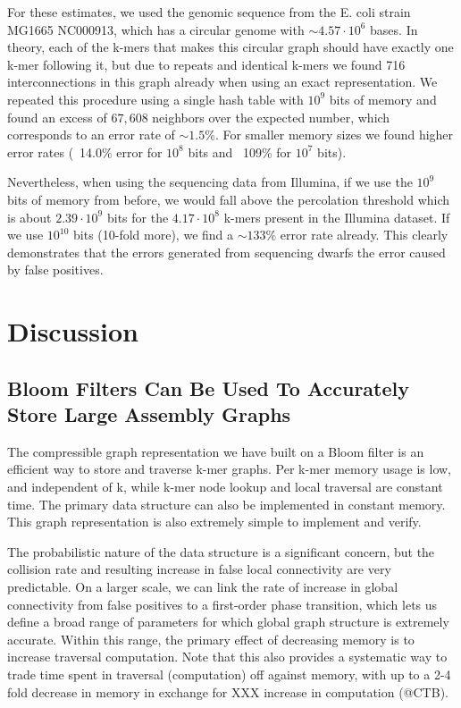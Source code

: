 \documentclass[12pt]{article} \usepackage{simplemargins}
\begin{document}
For these estimates, we used the genomic sequence from the E. coli strain 
MG1665 NC000913, which has a circular genome with $\sim 4.57 \cdot 10^6$ bases. 
In theory, each of the k-mers that makes this
circular graph should have exactly one k-mer following it, but due to 
repeats and identical k-mers we found 716 interconnections in this graph 
already when using an exact representation. We repeated this procedure 
using a single hash table with $10^9$ bits of memory and found an excess of 
$67,608$ neighbors over the expected number, which corresponds to an error rate of 
$\sim 1.5\%$. For smaller memory 
sizes we found higher error rates (~14.0\% error for $10^8$ bits and 
~109\% for $10^7$ bits).

Nevertheless, when using 
the sequencing data from Illumina, if we use the $10^9$ bits of memory 
from before, we would fall above the percolation threshold which is 
about $2.39 \cdot 10^9$ bits for the 
$4.17 \cdot 10^8$ k-mers present in the Illumina dataset. 
If we use $10^{10}$ bits (10-fold more), we find a $\sim 133\%$ 
error rate already. This clearly demonstrates that
the errors generated from sequencing dwarfs the error caused by false positives.

\section{Discussion}

\subsection{Bloom Filters Can Be Used To Accurately Store Large Assembly Graphs}
The compressible graph representation we have built on a Bloom filter
is an efficient way to store and traverse k-mer graphs.  Per k-mer
memory usage is low, and independent of k, while k-mer node lookup and
local traversal are constant time.  The primary data structure can
also be implemented in constant memory.  This graph representation is
also extremely simple to implement and verify.

The probabilistic nature of the data structure is a significant
concern, but the collision rate and resulting increase in false local
connectivity are very predictable.  On a larger scale, we can link the
rate of increase in global connectivity from false positives to a
first-order phase transition, which lets us define a broad range of
parameters for which global graph structure is extremely accurate.
Within this range, the primary effect of decreasing memory is to increase
traversal computation.  Note that this also provides a systematic way
to trade time spent in traversal (computation) off against memory,
with up to a 2-4 fold decrease in memory in exchange for XXX increase
in computation (@CTB).
\end{document}
